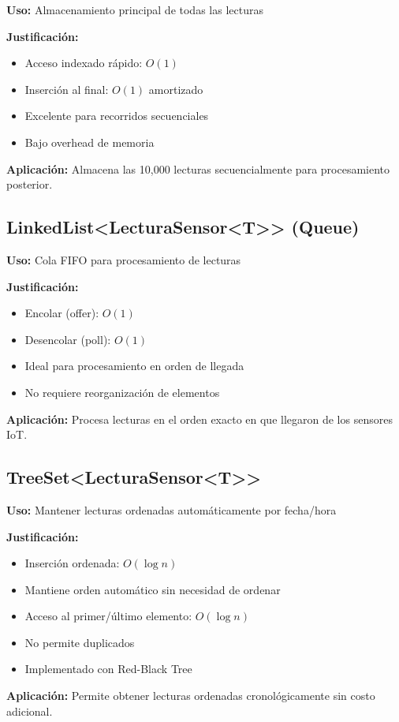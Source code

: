 \documentclass[12pt,a4paper]{article}
\begin{document}
\begin{tcolorbox}[colback=blue!5,colframe=blue!75!black,title=Almacenamiento Principal]
\textbf{Uso:} Almacenamiento principal de todas las lecturas

\textbf{Justificación:}
\begin{itemize}
    \item Acceso indexado rápido: $O(1)$
    \item Inserción al final: $O(1)$ amortizado
    \item Excelente para recorridos secuenciales
    \item Bajo overhead de memoria
\end{itemize}

\textbf{Aplicación:} Almacena las 10,000 lecturas secuencialmente para procesamiento posterior.
\end{tcolorbox}

\subsection{LinkedList<LecturaSensor<T>> (Queue)}

\begin{tcolorbox}[colback=blue!5,colframe=blue!75!black,title=Cola FIFO]
\textbf{Uso:} Cola FIFO para procesamiento de lecturas

\textbf{Justificación:}
\begin{itemize}
    \item Encolar (offer): $O(1)$
    \item Desencolar (poll): $O(1)$
    \item Ideal para procesamiento en orden de llegada
    \item No requiere reorganización de elementos
\end{itemize}

\textbf{Aplicación:} Procesa lecturas en el orden exacto en que llegaron de los sensores IoT.
\end{tcolorbox}

\subsection{TreeSet<LecturaSensor<T>>}

\begin{tcolorbox}[colback=blue!5,colframe=blue!75!black,title=Ordenamiento Automático]
\textbf{Uso:} Mantener lecturas ordenadas automáticamente por fecha/hora

\textbf{Justificación:}
\begin{itemize}
    \item Inserción ordenada: $O(\log n)$
    \item Mantiene orden automático sin necesidad de ordenar
    \item Acceso al primer/último elemento: $O(\log n)$
    \item No permite duplicados
    \item Implementado con Red-Black Tree
\end{itemize}

\textbf{Aplicación:} Permite obtener lecturas ordenadas cronológicamente sin costo adicional.
\end{tcolorbox}
\end{document}
